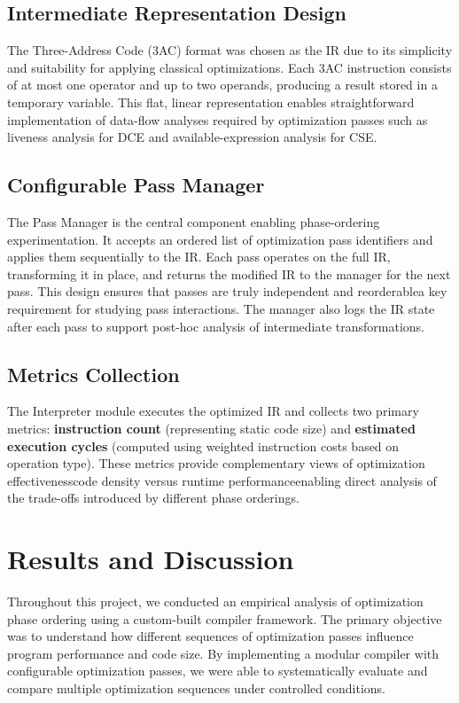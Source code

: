 \documentclass[conference]{IEEEtran}
\begin{document}
\subsection{Intermediate Representation Design}
The Three-Address Code (3AC) format was chosen as the IR due to its simplicity and suitability for applying classical optimizations. Each 3AC instruction consists of at most one operator and up to two operands, producing a result stored in a temporary variable. This flat, linear representation enables straightforward implementation of data-flow analyses required by optimization passes such as liveness analysis for DCE and available-expression analysis for CSE.

\subsection{Configurable Pass Manager}
The Pass Manager is the central component enabling phase-ordering experimentation. It accepts an ordered list of optimization pass identifiers and applies them sequentially to the IR. Each pass operates on the full IR, transforming it in place, and returns the modified IR to the manager for the next pass. This design ensures that passes are truly independent and reorderable\textemdash a key requirement for studying pass interactions. The manager also logs the IR state after each pass to support post-hoc analysis of intermediate transformations.

\subsection{Metrics Collection}
The Interpreter module executes the optimized IR and collects two primary metrics: \textbf{instruction count} (representing static code size) and \textbf{estimated execution cycles} (computed using weighted instruction costs based on operation type). These metrics provide complementary views of optimization effectiveness\textemdash code density versus runtime performance\textemdash enabling direct analysis of the trade-offs introduced by different phase orderings.

\section{Results and Discussion}
Throughout this project, we conducted an empirical analysis of optimization phase ordering using a custom-built compiler framework. The primary objective was to understand how different sequences of optimization passes influence program performance and code size. By implementing a modular compiler with configurable optimization passes, we were able to systematically evaluate and compare multiple optimization sequences under controlled conditions.
\end{document}
